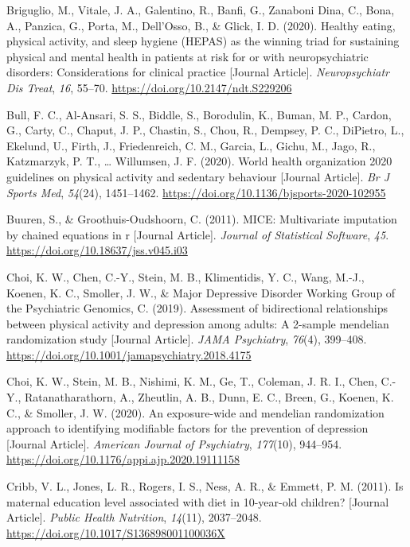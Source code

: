 \documentclass[
  letterpaper,
  DIV=11,
  numbers=noendperiod]{scrreport}
\newlength{\cslhangindent}
\newenvironment{CSLReferences}[2] %
 {\begin{list}{}{%
  \setlength{\itemindent}{0pt}
  \setlength{\leftmargin}{0pt}
  \setlength{\parsep}{0pt}
  \ifodd #1
   \setlength{\leftmargin}{\cslhangindent}
   \setlength{\itemindent}{-1\cslhangindent}
  \fi
  \setlength{\itemsep}{#2\baselineskip}}}
 {\end{list}}
\begin{document}
\begin{CSLReferences}{1}{0}
Briguglio, M., Vitale, J. A., Galentino, R., Banfi, G., Zanaboni Dina,
C., Bona, A., Panzica, G., Porta, M., Dell'Osso, B., \& Glick, I. D.
(2020). Healthy eating, physical activity, and sleep hygiene (HEPAS) as
the winning triad for sustaining physical and mental health in patients
at risk for or with neuropsychiatric disorders: Considerations for
clinical practice {[}Journal Article{]}. \emph{Neuropsychiatr Dis
Treat}, \emph{16}, 55--70. \url{https://doi.org/10.2147/ndt.S229206}

Bull, F. C., Al-Ansari, S. S., Biddle, S., Borodulin, K., Buman, M. P.,
Cardon, G., Carty, C., Chaput, J. P., Chastin, S., Chou, R., Dempsey, P.
C., DiPietro, L., Ekelund, U., Firth, J., Friedenreich, C. M., Garcia,
L., Gichu, M., Jago, R., Katzmarzyk, P. T., \ldots{} Willumsen, J. F.
(2020). World health organization 2020 guidelines on physical activity
and sedentary behaviour {[}Journal Article{]}. \emph{Br J Sports Med},
\emph{54}(24), 1451--1462.
\url{https://doi.org/10.1136/bjsports-2020-102955}

Buuren, S., \& Groothuis-Oudshoorn, C. (2011). MICE: Multivariate
imputation by chained equations in r {[}Journal Article{]}.
\emph{Journal of Statistical Software}, \emph{45}.
\url{https://doi.org/10.18637/jss.v045.i03}

Choi, K. W., Chen, C.-Y., Stein, M. B., Klimentidis, Y. C., Wang, M.-J.,
Koenen, K. C., Smoller, J. W., \& Major Depressive Disorder Working
Group of the Psychiatric Genomics, C. (2019). Assessment of
bidirectional relationships between physical activity and depression
among adults: A 2-sample mendelian randomization study {[}Journal
Article{]}. \emph{JAMA Psychiatry}, \emph{76}(4), 399--408.
\url{https://doi.org/10.1001/jamapsychiatry.2018.4175}

Choi, K. W., Stein, M. B., Nishimi, K. M., Ge, T., Coleman, J. R. I.,
Chen, C.-Y., Ratanatharathorn, A., Zheutlin, A. B., Dunn, E. C., Breen,
G., Koenen, K. C., \& Smoller, J. W. (2020). An exposure-wide and
mendelian randomization approach to identifying modifiable factors for
the prevention of depression {[}Journal Article{]}. \emph{American
Journal of Psychiatry}, \emph{177}(10), 944--954.
\url{https://doi.org/10.1176/appi.ajp.2020.19111158}

Cribb, V. L., Jones, L. R., Rogers, I. S., Ness, A. R., \& Emmett, P. M.
(2011). Is maternal education level associated with diet in 10-year-old
children? {[}Journal Article{]}. \emph{Public Health Nutrition},
\emph{14}(11), 2037--2048.
\url{https://doi.org/10.1017/S136898001100036X}


\end{CSLReferences}
\end{document}
